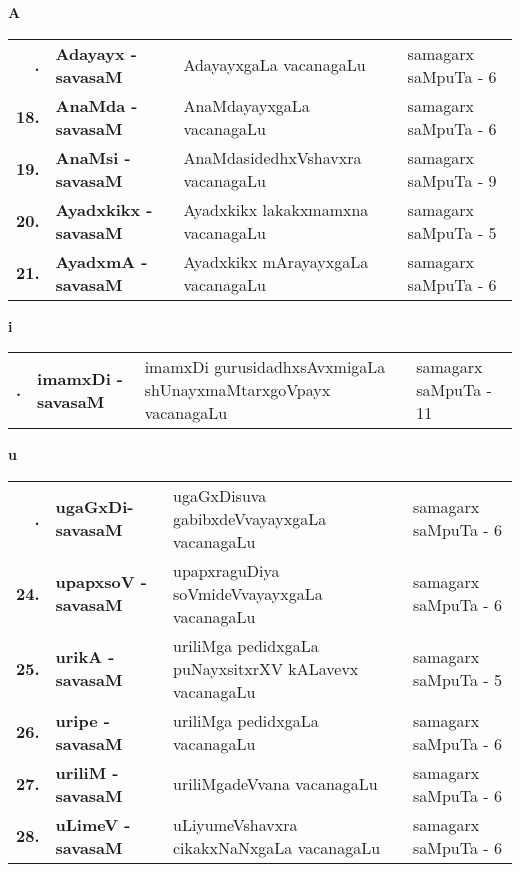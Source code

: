 \centerline{\bf A}

\medskip

{\renewcommand{\arraystretch}{1.35}
\begin{longtable}{>{\bf}r>{\bf}l>{\raggedright}p{8cm}l}
\endfirsthead
\endhead
\endfoot
\endlastfoot
17. & Adayayx - savasaM & AdayayxgaLa vacanagaLu & samagarx saMpuTa - 6\\
18. & AnaMda - savasaM & AnaMdayayxgaLa vacanagaLu & samagarx saMpuTa - 6 \\
19. & AnaMsi - savasaM & AnaMdasidedhxVshavxra vacanagaLu & samagarx saMpuTa - 9 \\
20. & Ayadxkikx - savasaM & Ayadxkikx lakakxmamxna vacanagaLu & samagarx saMpuTa - 5 \\
21. & AyadxmA - savasaM & Ayadxkikx mArayayxgaLa vacanagaLu & samagarx saMpuTa - 6
\end{longtable}}

\centerline{\bf i}

{\renewcommand{\arraystretch}{1.35}
\begin{longtable}{>{\bf}r>{\bf}l>{\raggedright}p{8cm}l}
\endfirsthead
\endhead
\endfoot
\endlastfoot
22. & imamxDi - savasaM & imamxDi gurusidadhxsAvxmigaLa shUnayxmaMtarxgoVpayx vacanagaLu & samagarx saMpuTa - 11\\
\end{longtable}}


\bigskip

\newpage

\centerline{\bf u}

\medskip

{\renewcommand{\arraystretch}{1.3}
\begin{longtable}{>{\bf}r>{\bf}l>{\raggedright}p{8cm}l}
\endfirsthead
\endhead
\endfoot
\endlastfoot
23. &  ugaGxDi- savasaM & ugaGxDisuva gabibxdeVvayayxgaLa vacanagaLu & samagarx saMpuTa - 6\\
24. &  upapxsoV - savasaM & upapxraguDiya soVmideVvayayxgaLa vacanagaLu & samagarx saMpuTa - 6 \\
25. &  urikA - savasaM & uriliMga pedidxgaLa puNayxsitxrXV kALavevx vacanagaLu & samagarx saMpuTa - 5\\
26. &  uripe - savasaM & uriliMga pedidxgaLa vacanagaLu & samagarx saMpuTa - 6\\
27. &  uriliM - savasaM & uriliMgadeVvana vacanagaLu & samagarx saMpuTa - 6\\
28. &  uLimeV - savasaM & uLiyumeVshavxra cikakxNaNxgaLa vacanagaLu & samagarx saMpuTa - 6\\
\end{longtable}}
\bigskip

